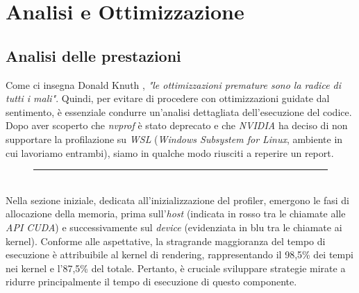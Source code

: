 \documentclass[main.tex]{subfiles}
\begin{document}
\section{Analisi e Ottimizzazione}\label{sec:ottimizzazione}


\subsection{Analisi delle prestazioni}

\hspace*{0.25in}Come ci insegna Donald Knuth \cite{knuth}, \textit{"le ottimizzazioni premature sono la radice di tutti i mali"}. Quindi, per evitare di procedere con ottimizzazioni guidate dal sentimento, è essenziale condurre un'analisi dettagliata dell'esecuzione del codice. 
Dopo aver scoperto che \textit{nvprof} è stato deprecato e che \textit{NVIDIA} ha deciso di non supportare la profilazione su \textit{WSL} (\textit{Windows Subsystem for Linux}, ambiente in cui lavoriamo entrambi), siamo in qualche modo riusciti a reperire un report. 
\begin{figure}[h]
    \centering
    \captionsetup{aboveskip=0pt}
    \vspace{-14pt}\rule{0.95\linewidth}{0.4pt}
\end{figure}\\
Nella sezione iniziale, dedicata all'inizializzazione del profiler, emergono le fasi di allocazione della memoria, prima sull'\textit{host} (indicata in rosso tra le chiamate alle \textit{API CUDA}) e successivamente sul \textit{device} (evidenziata in blu tra le chiamate ai kernel).
Conforme alle aspettative, la stragrande maggioranza del tempo di esecuzione è attribuibile al kernel di rendering, rappresentando il 98,5\% dei tempi nei kernel e l'87,5\% del totale. Pertanto, è cruciale sviluppare strategie mirate a ridurre principalmente il tempo di esecuzione di questo componente.
\end{document}
